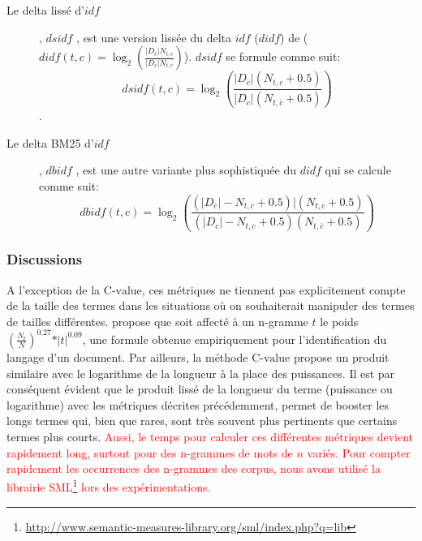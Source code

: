 \begin{description}
    \item[Le \og delta lissé d'$idf$\fg{}], $dsidf$ \citep{paltoglou2010dsidfANDdbidf}, est une version lissée du delta $idf$ ($didf$) de \citet{martineau2009didf} ($didf(t,c)=\log_2\left(\frac{\vert D_{\overline{c}} \vert N_{t,c}}{\vert D_c \vert N_{t,\overline{c}}}\right)$). $dsidf$ se formule comme suit:
    \[dsidf(t,c) = \log_2\left(\frac{\vert D_{\overline{c}} \vert (N_{t,c} + 0.5)}{\vert D_c \vert (N_{t,\overline{c}} + 0.5)}\right)\].
    \item[Le delta BM25 d'$idf$], $dbidf$ \citep{paltoglou2010dsidfANDdbidf}, est une autre variante plus sophistiquée du $didf$ qui se calcule comme suit:
    \[dbidf(t,c) = \log_2\left(\frac{( \vert D_{\overline{c}} \vert  - N_{t,\overline{c}} + 0.5) \vert (N_{t,c} + 0.5)}{(\vert D_c \vert - N_{t,c} + 0.5) (N_{t,\overline{c}} + 0.5)}\right)\]
\end{description}

\subsubsection{Discussions}

A l'exception de la $\text{C-value}$, ces métriques ne tiennent pas explicitement compte de la taille des termes dans les situations où on souhaiterait manipuler des termes de tailles différentes. \citep{brown2013ngram1100languages} propose que soit affecté à un n-gramme $t$ le poids $\left(\frac{N_t}{N}\right)^{0.27} * \vert t \vert^{0.09}$, une formule obtenue empiriquement pour l'identification du langage d'un document. Par ailleurs, la méthode $\text{C-value}$ \citep{frantzi2000CValueNCValue} propose un produit similaire avec le logarithme de la longueur à la place des puissances. Il est par conséquent évident que le produit lissé de la longueur du terme (puissance ou logarithme) avec les métriques décrites précédemment, permet de booster les longs termes qui, bien que rares, sont très souvent plus pertinents que certains termes plus courts. \textcolor{red}{Aussi, le temps  pour calculer ces différentes métriques devient rapidement long, surtout pour des n-grammes de mots de $n$ variés. Pour compter rapidement les occurrences des n-grammes des corpus, nous avons utilisé la librairie SML\footnote{\url{http://www.semantic-measures-library.org/sml/index.php?q=lib}} \cite{harispe2013semlib} lors des expérimentations.}


